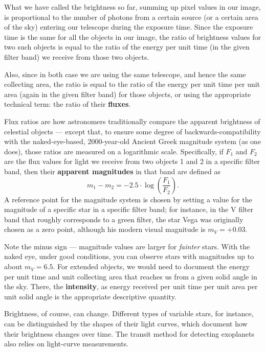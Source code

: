 \documentclass[twocolumn,apj]{openjournal}
\newcommand{\be}{\begin{equation}}
\newcommand{\ee}{\end{equation}}
\begin{document}
What we have called the brightness so far, summing up pixel values in our image, is proportional to the number of photons from a certain source (or a certain area of the sky) entering our telescope during the exposure time. Since the exposure time is the same for all the objects in our image, the ratio of brightness values for two such objects is equal to the ratio of the energy per unit time (in the given filter band) we receive from those two objects. 

Also, since in both case we are using the same telescope, and hence the same collecting area, the ratio is equal to the ratio of the energy per unit time per unit area (again in the given filter band) for those objects, or using the appropriate technical term: the ratio of their {\bf fluxes}. 

Flux ratios are how astronomers traditionally compare the apparent brightness of celestial objects --- except that, to ensure some degree of backwards-compatibility with the naked-eye-based, 2000-year-old Ancient Greek magnitude system (as one does), those ratios are measured on a logarithmic scale. Specifically, if $F_1$ and $F_2$ are the flux values for light we receive from two objects 1 and 2 in a specific filter band, then their {\bf apparent magnitudes} in that band are defined as
\be
m_1-m_2 = -2.5\cdot\log\left(\frac{F_1}{F_2}\right).
\label{AstroMagnitudeFormula}
\ee
A reference point for the magnitude system is chosen by setting a value for the magnitude of a specific star in a specific filter band; for instance, in the V filter band that roughly corresponds to a green filter, the star Vega was originally chosen as a zero point, although his modern visual magnitude is $m_V = +0.03$. 

Note the minus sign --- magnitude values are larger for {\em fainter} stars. With the naked eye, under good conditions, you can observe stars with magnitudes up to about $m_V=6.5.$ For extended objects, we would need to document the energy per unit time and unit collecting area that reaches us from a given solid angle in the sky. There, the {\bf intensity}, as energy received per unit time per unit area per unit solid angle is the appropriate descriptive quantity.

Brightness, of course, can change. Different types of variable stars, for instance, can be distinguished by the shapes of their light curves, which document how their brightness changes over time. The transit method for detecting exoplanets also relies on light-curve measurements. 
\end{document}
